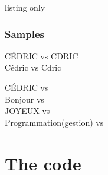 \documentclass[11pt,a4paper]{ltxdoc}
\begin{document}
\begin{DemoCode}{listing only}
\end{DemoCode}

\subsubsection{Samples}

\begin{DemoCode}{}
{\large\ttfamily CÉDRIC vs CDRIC}\\
{\large\ttfamily Cédric vs Cdric}\\
\end{DemoCode}

\begin{DemoCode}{}
{\large\ttfamily CÉDRIC vs }\\
{\large\ttfamily Bonjour vs }\\
{\large\ttfamily JOYEUX vs }\\
{\large\ttfamily Programmation(gestion) vs }
\end{DemoCode}

\pagebreak

\section{The code}

\end{document}
